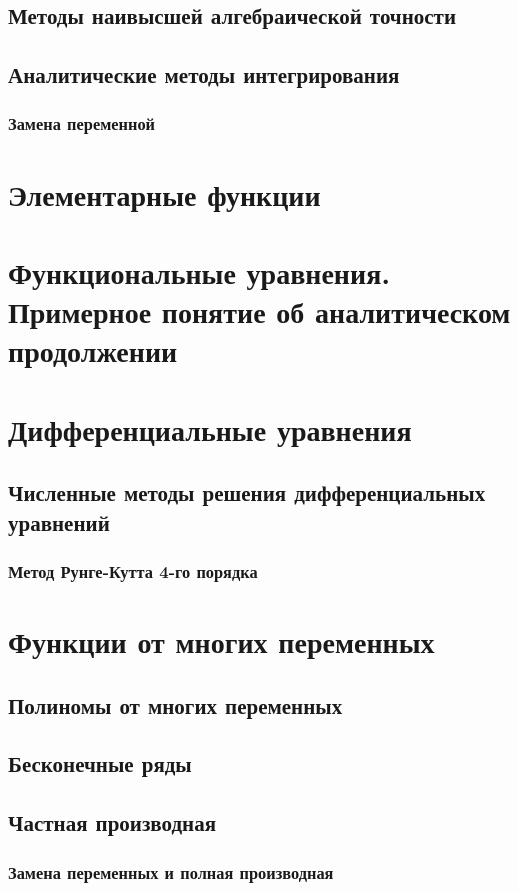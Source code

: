 \documentclass{article}
\begin{document}
\subsection{Методы наивысшей алгебраической точности}
\subsection{Аналитические методы интегрирования}
\subsubsection{Замена переменной}
\section{Элементарные функции}
\section{Функциональные уравнения. Примерное понятие об аналитическом продолжении}
\section{Дифференциальные уравнения}
\subsection{Численные методы решения дифференциальных уравнений}
\subsubsection{Метод Рунге-Кутта 4-го порядка}
\section{Функции от многих переменных}
\subsection{Полиномы от многих переменных}
\subsection{Бесконечные ряды}
\subsection{Частная производная}
\subsubsection{Замена переменных и полная производная}
\end{document}
